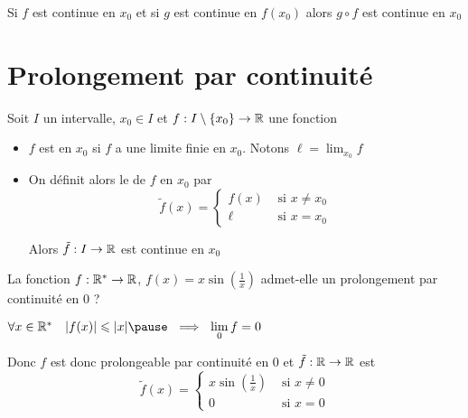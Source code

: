 \begin{frame}
  
\begin{proposition}
Si $f$ est continue en $x_0$ et si $g$ est continue en $f(x_0)$
alors $g\circ f$ est continue en $x_0$
\end{proposition}  
  
\end{frame}


\section{Prolongement par continuité}

\begin{frame}

\begin{mydefinition}
Soit $I$ un intervalle, $x_0\in I$ et $f:I\setminus\{x_0\}\to\mathbb{R}$ une fonction
\pause 
\begin{itemize}
  \item $f$ est  en $x_0$ si $f$ a une 
  limite finie en $x_0$. \pause Notons $\ell=\displaystyle\lim_{x_0} f$
  \item<4-> On définit alors le  de $f$ en $x_0$ par
  \vspace*{-1ex}
  \[
  \tilde f(x) =
  \begin{cases}
  f(x) &\text{ si } x\neq x_0\\
  \ell &\text{ si } x=x_0
  \end{cases}
  \] 
  
   \vspace*{-2ex}
  \pause 
 Alors $\tilde f:I\to\mathbb{R}$ est continue en $x_0$
\end{itemize}
\end{mydefinition}

  
\end{frame}


\begin{frame}

\begin{exemple}
La fonction $f:\mathbb{R}^*\to\mathbb{R}$, $f(x)=x\sin\left(\frac1x\right)$ admet-elle un prolongement par continuité en $0$ ?  \pause

\medskip

\centerline{$\forall x\in\Rr^* \quad \vert f(x)\vert\leq \vert x\vert  \pause \ \implies \ \displaystyle\lim_0 f = 0$}

\bigskip

\pause
Donc $f$ est donc prolongeable par continuité en $0$ et $\tilde f:\mathbb{R}\to\mathbb{R}$ est
\[
\tilde f(x) = 
  \begin{cases}
  x\sin\left(\frac1x\right) &\text{ si } x\neq 0\\
  0 &\text{ si } x=0
  \end{cases}
\]

\end{exemple}
  
\end{frame}


